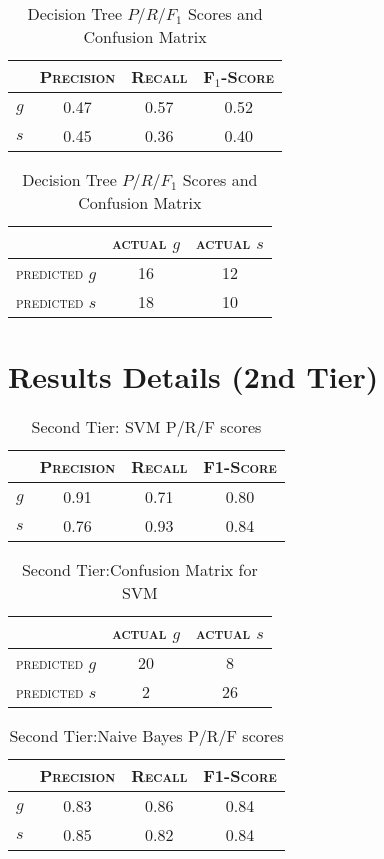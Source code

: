 \begin{table}[ht]
\begin{minipage}[b]{0.45\linewidth}\centering
\begin{tabular}{ c | c  c  c }
	& \textsc{Precision} & \textsc{Recall} & \textsc{F$_1$-Score} \\
	\hline
	\textsc{$g$} 	& 0.47 & 0.57 & 0.52 \\
	\textsc{$s$}	& 0.45 & 0.36 & 0.40
\end{tabular}
\end{minipage}
\hspace{0.5cm}
\begin{minipage}[b]{0.45\linewidth}
\centering
\begin{tabular}{ c | c  c }
	 & \textsc{actual $g$} & \textsc{actual $s$} \\
	\hline
	\textsc{predicted $g$} 	& 16 & 12 \\
	\textsc{predicted $s$}		& 18 & 10
\end{tabular}
\end{minipage}
\caption{Decision Tree $P/R/F_1$ Scores and Confusion Matrix}
\end{table}

\chapter{Results Details (2nd Tier)}

\begin{table}[h]
	\center
	\begin{tabular}{ c | c  c  c }
		& \textsc{Precision} & \textsc{Recall} & \textsc{F1-Score} \\
		\hline
		\textsc{$g$} 	& 0.91 & 0.71 & 0.80 \\
		\textsc{$s$}	& 0.76 & 0.93 & 0.84
	\end{tabular}
	\caption{Second Tier: SVM P/R/F scores}
\end{table}

\begin{table}[h]
	\center
	\begin{tabular}{ c | c  c }
		 & \textsc{actual $g$} & \textsc{actual $s$} \\
		\hline
		\textsc{predicted $g$} 	& 20 & 8 \\
		\textsc{predicted $s$}		& 2 & 26
	\end{tabular}
	\caption{Second Tier:Confusion Matrix for SVM}
\end{table}

\begin{table}[h]
	\center
	\begin{tabular}{ c | c  c  c }
		& \textsc{Precision} & \textsc{Recall} & \textsc{F1-Score} \\
		\hline
		\textsc{$g$} 	& 0.83 & 0.86 & 0.84 \\
		\textsc{$s$}	& 0.85 & 0.82 & 0.84
	\end{tabular}
	\caption{Second Tier:Naive Bayes P/R/F scores}
\end{table}


